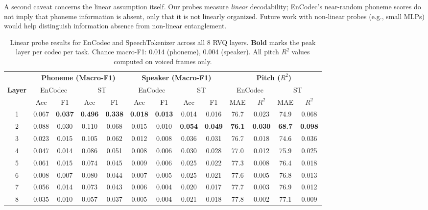\documentclass[10pt,twocolumn]{article}
\begin{document}
A second caveat concerns the linear assumption itself. Our probes
measure \emph{linear} decodability; EnCodec's near-random phoneme
scores do not imply that phoneme information is absent, only that it is
not linearly organized. Future work with non-linear probes (e.g.,
small MLPs) would help distinguish information absence from non-linear
entanglement.

\begin{table}[t]
  \centering
  \caption{Linear probe results for EnCodec and SpeechTokenizer across
           all 8 RVQ layers. \textbf{Bold} marks the peak layer per
           codec per task. Chance macro-F1: 0.014 (phoneme), 0.004
           (speaker). All pitch $R^2$ values computed on voiced frames
           only.}
  \label{tab:results}
  \setlength{\tabcolsep}{5pt}
  \begin{tabular}{c cc cc cc cc cc cc}
    \toprule
    & \multicolumn{4}{c}{\textbf{Phoneme (Macro-F1)}} &
      \multicolumn{4}{c}{\textbf{Speaker (Macro-F1)}} &
      \multicolumn{4}{c}{\textbf{Pitch ($R^2$)}} \\
    \cmidrule(lr){2-5}\cmidrule(lr){6-9}\cmidrule(lr){10-13}
    \textbf{Layer} &
      \multicolumn{2}{c}{EnCodec} & \multicolumn{2}{c}{ST} &
      \multicolumn{2}{c}{EnCodec} & \multicolumn{2}{c}{ST} &
      \multicolumn{2}{c}{EnCodec} & \multicolumn{2}{c}{ST} \\
    & Acc & F1 & Acc & F1 & Acc & F1 & Acc & F1 & MAE & $R^2$ & MAE & $R^2$ \\
    \midrule
    1 & 0.067 & \textbf{0.037} & \textbf{0.496} & \textbf{0.338}
      & \textbf{0.018} & \textbf{0.013} & 0.014 & 0.016
      & 76.7 & 0.023 & 74.9 & 0.068 \\
    2 & 0.088 & 0.030 & 0.110 & 0.068
      & 0.015 & 0.010 & \textbf{0.054} & \textbf{0.049}
      & \textbf{76.1} & \textbf{0.030} & \textbf{68.7} & \textbf{0.098} \\
    3 & 0.023 & 0.015 & 0.105 & 0.062
      & 0.012 & 0.008 & 0.036 & 0.031
      & 76.7 & 0.018 & 74.6 & 0.036 \\
    4 & 0.047 & 0.014 & 0.086 & 0.051
      & 0.008 & 0.006 & 0.030 & 0.028
      & 77.0 & 0.012 & 75.9 & 0.025 \\
    5 & 0.061 & 0.015 & 0.074 & 0.045
      & 0.009 & 0.006 & 0.025 & 0.022
      & 77.3 & 0.008 & 76.4 & 0.018 \\
    6 & 0.008 & 0.007 & 0.080 & 0.044
      & 0.007 & 0.005 & 0.025 & 0.021
      & 77.6 & 0.005 & 76.8 & 0.013 \\
    7 & 0.056 & 0.014 & 0.073 & 0.043
      & 0.006 & 0.004 & 0.020 & 0.017
      & 77.7 & 0.003 & 76.9 & 0.012 \\
    8 & 0.035 & 0.010 & 0.057 & 0.037
      & 0.005 & 0.004 & 0.021 & 0.018
      & 77.8 & 0.002 & 77.1 & 0.009 \\
    \bottomrule
  \end{tabular}
\end{table}
\end{document}
